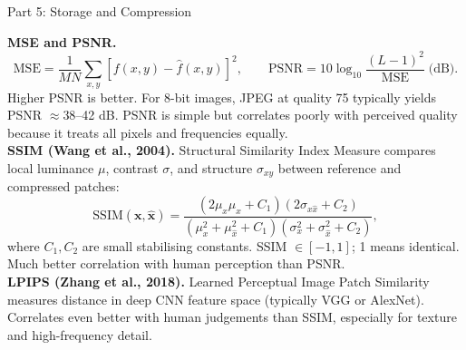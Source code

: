 \documentclass[letterpaper]{article}
\begin{document}
\begin{notes}{Part 5: Storage and Compression}

\textbf{MSE and PSNR.}
$$\mathrm{MSE} = \frac{1}{MN}\sum_{x,y}[f(x,y)-\hat{f}(x,y)]^2, \qquad \mathrm{PSNR} = 10\log_{10}\frac{(L-1)^2}{\mathrm{MSE}}\;\text{(dB)}.$$
Higher PSNR is better. For 8-bit images, JPEG at quality 75 typically yields PSNR $\approx 38$--42 dB. PSNR is simple but correlates poorly with perceived quality because it treats all pixels and frequencies equally.\\

\textbf{SSIM (Wang et al., 2004).} Structural Similarity Index Measure compares local luminance $\mu$, contrast $\sigma$, and structure $\sigma_{xy}$ between reference and compressed patches:
$$\mathrm{SSIM}(\mathbf{x},\hat{\mathbf{x}}) = \frac{(2\mu_x\mu_{\hat{x}}+C_1)(2\sigma_{x\hat{x}}+C_2)}{(\mu_x^2+\mu_{\hat{x}}^2+C_1)(\sigma_x^2+\sigma_{\hat{x}}^2+C_2)},$$
where $C_1, C_2$ are small stabilising constants. SSIM $\in [-1,1]$; 1 means identical. Much better correlation with human perception than PSNR.\\

\textbf{LPIPS (Zhang et al., 2018).} Learned Perceptual Image Patch Similarity measures distance in deep CNN feature space (typically VGG or AlexNet). Correlates even better with human judgements than SSIM, especially for texture and high-frequency detail.


\end{notes}
\end{document}
